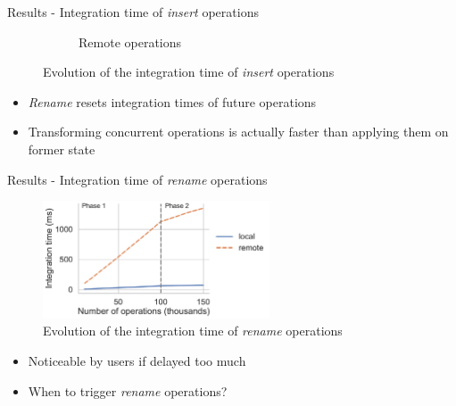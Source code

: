 \documentclass[10pt]{beamer}
\begin{document}
\begin{frame}{Results - Integration time of \emph{insert} operations}
\begin{figure}
\begin{subfigure}{0.47\textwidth}
        \caption{Remote operations}
        \label{fig:evolution-integration-time-remote-insert-remove}
    \end{subfigure}
    \caption{Evolution of the integration time of \emph{insert} operations}
    \label{fig:evolution-integration-time-insert-remove}
  \end{figure}

  \vspace{-1\baselineskip}
  \begin{itemize}
    \pause
    \item \emph{Rename} resets integration times of future operations
    \pause
    \item Transforming concurrent operations is actually faster than applying them on former state
  \end{itemize}

\end{frame}

\begin{frame}{Results - Integration time of \emph{rename} operations}
  \begin{figure}
    \centering
    \includegraphics[width=0.6\textwidth]{img/integration-time-rename.pdf}
    \caption{Evolution of the integration time of \emph{rename} operations}
    \label{fig:evolution-integration-time-rename}
  \end{figure}

  \vspace{-1\baselineskip}
  \begin{itemize}
    \pause
    \item Noticeable by users if delayed too much
    \pause
    \item When to trigger \emph{rename} operations?
  \end{itemize}
\end{frame}
\end{document}
